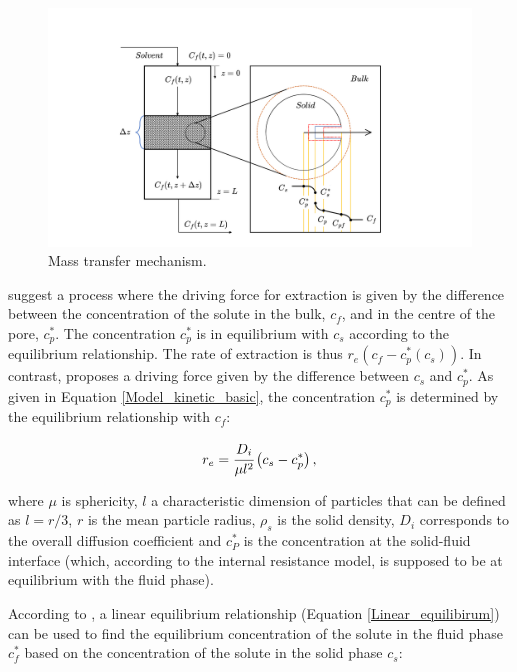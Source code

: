 \documentclass[a4paper,fleqn]{cas-dc}
\begin{document}
	\begin{figure}[h!]
		\centering
		\includegraphics[trim = 45cm 0cm 60cm 20cm,clip,width=0.85\columnwidth]{Figures/SFE_PFD.drawio.png}	
		\caption{Mass transfer mechanism.}
		\label{fig: SFE_Mechanism}
	\end{figure}
	
	\citet{Bulley1984} suggest a process where the driving force for extraction is given by the difference between the concentration of the solute in the bulk, $c_f$, and in the centre of the pore, $c_p^*$. The concentration $c_p^*$ is in equilibrium with $c_s$ according to the equilibrium relationship. The rate of extraction is thus $r_e\left(c_f - c^*_p(c_s)\right)$. In contrast, \citet{Reverchon1996} proposes a driving force given by the difference between $c_s$ and $c_p^*$. As given in Equation \ref{Model_kinetic_basic}, the concentration $c_p^*$ is determined by the equilibrium relationship with $c_f$:
	
	{\footnotesize
		\begin{equation} \label{Model_kinetic_basic}
			r_e = \cfrac{D_i}{\mu l^2 }\left(c_s - c_p^* \right),
	\end{equation} }
	
	where $\mu$ is sphericity, $l$ a characteristic dimension of particles that can be defined as $l = r/3$, $r$ is the mean particle radius, $\rho_s$ is the solid density, $D_i$ corresponds to the overall diffusion coefficient and $c_P^*$ is the concentration at the solid-fluid interface (which, according to the internal resistance model, is supposed to be at equilibrium with the fluid phase). 
	
	According to \citet{Bulley1984}, a linear equilibrium relationship (Equation \ref{Linear_equilibirum}) can be used to find the equilibrium concentration of the solute in the fluid phase $c_f^*$ based on the concentration of the solute in the solid phase $c_s$:
	
\end{document}
